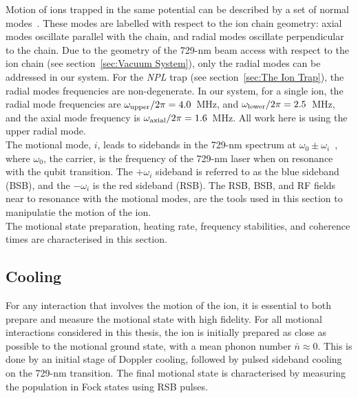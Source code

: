    Motion of ions trapped in the same potential can be described by a set of normal modes~\cite{james1998quantum}. These modes are labelled with respect to the ion chain geometry: axial modes oscillate parallel with the chain, and radial modes oscillate perpendicular to the chain. Due to the geometry of the 729-nm beam access with respect to the ion chain (see section~\ref{sec:Vacuum System}), only the radial modes can be addressed in our system. For the \emph{NPL} trap (see section~\ref{sec:The Ion Trap}), the radial modes frequencies are non-degenerate. In our system, for a single ion, the radial mode frequencies are $\omega_{\rm upper}/2\pi = 4.0$~\unit{\MHz}, and $\omega_{\rm lower}/2\pi = 2.5$~\unit{\MHz}, and the axial mode frequency is $\omega_{\rm axial}/2\pi = 1.6$~\unit{\MHz}. All work here is using the upper radial mode. \\
    The motional mode, $i$, leads to sidebands in the 729-nm spectrum at $\omega_0 \pm \omega_{i}$~\cite{ozeri2011tutorial}, where $\omega_0$, the carrier, is the frequency of the 729-nm laser when on resonance with the qubit transition. The $+\omega_i$ sideband is referred to as the blue sideband (BSB), and the $-\omega_i$ is the red sideband (RSB).
    The RSB, BSB, and RF fields near to resonance with the motional modes, are the tools used in this section to manipulatie the motion of the ion.\\
    The motional state preparation, heating rate, frequency stabilities, and coherence times are characterised in this section.

\subsection{Cooling}
\label{sec:Cooling}

    For any interaction that involves the motion of the ion, it is essential to both prepare and measure the motional state with high fidelity. For all motional interactions considered in this thesis, the ion is initially prepared as close as possible to the motional ground state, with a mean phonon number $\bar{n} \approx 0$. This is done by an initial stage of Doppler cooling, followed by pulsed sideband cooling on the 729-nm transition. The final motional state is characterised by measuring the population in Fock states using RSB pulses.\\

